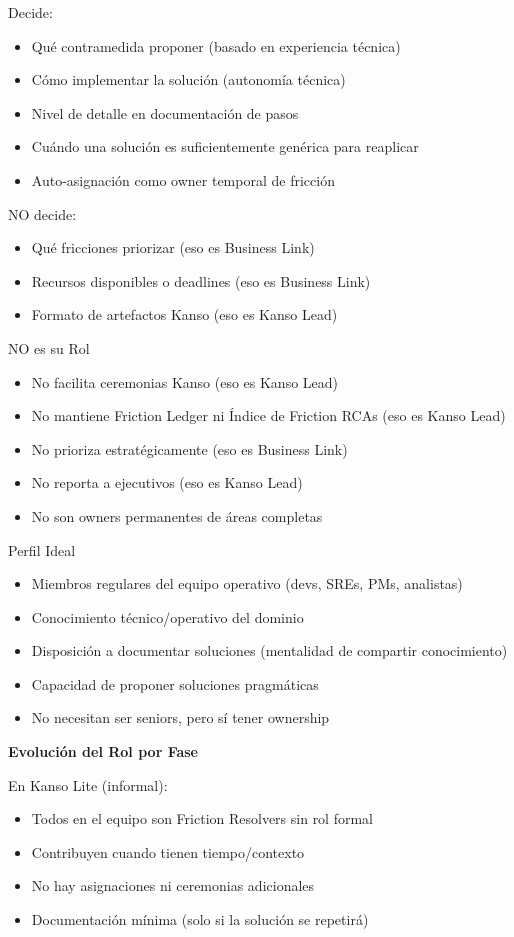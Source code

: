 Decide:
\begin{itemize}
    \item Qué contramedida proponer (basado en experiencia técnica)
    \item Cómo implementar la solución (autonomía técnica)
    \item Nivel de detalle en documentación de pasos
    \item Cuándo una solución es suficientemente genérica para reaplicar
    \item Auto-asignación como owner temporal de fricción
\end{itemize}

NO decide:
\begin{itemize}
    \item Qué fricciones priorizar (eso es Business Link)
    \item Recursos disponibles o deadlines (eso es Business Link)
    \item Formato de artefactos Kanso (eso es Kanso Lead)
\end{itemize}

NO es su Rol
\begin{itemize}
    \item No facilita ceremonias Kanso (eso es Kanso Lead)
    \item No mantiene Friction Ledger ni Índice de Friction RCAs (eso es Kanso Lead)
    \item No prioriza estratégicamente (eso es Business Link)
    \item No reporta a ejecutivos (eso es Kanso Lead)
    \item No son owners permanentes de áreas completas
\end{itemize}

Perfil Ideal
\begin{itemize}
    \item Miembros regulares del equipo operativo (devs, SREs, PMs, analistas)
    \item Conocimiento técnico/operativo del dominio
    \item Disposición a documentar soluciones (mentalidad de compartir conocimiento)
    \item Capacidad de proponer soluciones pragmáticas
    \item No necesitan ser seniors, pero sí tener ownership
\end{itemize}

\textbf{Evolución del Rol por Fase}

En Kanso Lite (informal):
\begin{itemize}
    \item Todos en el equipo son Friction Resolvers sin rol formal
    \item Contribuyen cuando tienen tiempo/contexto
    \item No hay asignaciones ni ceremonias adicionales
    \item Documentación mínima (solo si la solución se repetirá)
\end{itemize}

